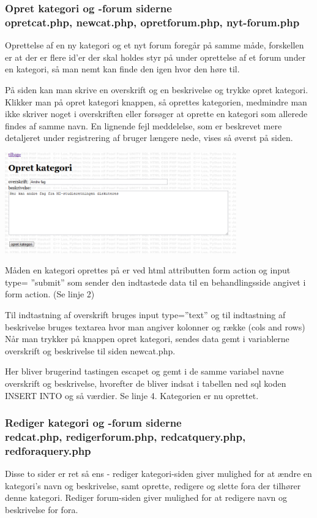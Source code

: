 \documentclass{article}
\begin{document}
\subsubsection[Opret kategori og -forum siderne]{Opret kategori og -forum siderne \\opretcat.php, newcat.php, opretforum.php, nyt-forum.php}
Oprettelse af en ny kategori og et nyt forum foregår på samme måde, forskellen er at der er flere id’er der skal holdes styr på under oprettelse af et forum under en kategori, så man nemt kan finde den igen hvor den høre til.

På siden kan man skrive en overskrift og en beskrivelse og trykke opret kategori. Klikker man på opret kategori knappen, så oprettes kategorien, medmindre man ikke skriver noget i overskriften eller forsøger at oprette en kategori som allerede findes af samme navn. En lignende fejl meddelelse, som er beskrevet mere detaljeret under registrering af bruger længere nede, vises så øverst på siden.

\includegraphics[width=100mm]{mi18.png}

Måden en kategori oprettes på er ved html attributten form action og input type= ”submit” som sender den indtastede data til en behandlingsside angivet i form action. (Se linje 2)



Til indtastning af overskrift bruges input type=”text” og til indtastning af beskrivelse bruges textarea hvor man angiver kolonner og række (cols and rows)
Når man trykker på knappen opret kategori, sendes data gemt i variablerne overskrift og beskrivelse til siden newcat.php.



Her bliver brugerind tastingen escapet og gemt i de samme variabel navne overskrift og beskrivelse, hvorefter de bliver indsat i tabellen ned sql koden INSERT INTO og så værdier. Se linje 4.
Kategorien er nu oprettet.

\subsubsection[Rediger kategori og -forum siderne]{Rediger kategori og -forum siderne \\redcat.php, redigerforum.php, redcatquery.php, redforaquery.php}
Disse to sider er ret så ens - rediger kategori-siden giver mulighed for at ændre en kategori's navn og beskrivelse, samt oprette, redigere og slette fora der tilhører denne kategori. Rediger forum-siden giver mulighed for at redigere navn og beskrivelse for fora.
\end{document}
